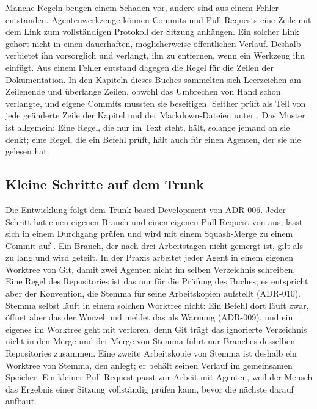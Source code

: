 Manche Regeln beugen einem Schaden vor, andere sind aus einem Fehler entstanden.
Agentenwerkzeuge können Commits und Pull Requests eine Zeile
mit dem Link zum vollständigen Protokoll der Sitzung anhängen.
Ein solcher Link gehört nicht in einen dauerhaften, möglicherweise öffentlichen Verlauf.
Deshalb verbietet  ihn vorsorglich
und verlangt, ihn zu entfernen, wenn ein Werkzeug ihn einfügt.
Aus einem Fehler entstand dagegen die Regel für die Zeilen der Dokumentation.
In den Kapiteln dieses Buches sammelten sich Leerzeichen am Zeilenende und überlange Zeilen,
obwohl  das Umbrechen von Hand schon verlangte,
und eigene Commits mussten sie beseitigen.
Seither prüft  als Teil von 
jede geänderte Zeile der Kapitel und der Markdown-Dateien unter .
Das Muster ist allgemein:
Eine Regel, die nur im Text steht, hält, solange jemand an sie denkt;
eine Regel, die ein Befehl prüft, hält auch für einen Agenten, der sie nie gelesen hat.

\subsection{Kleine Schritte auf dem Trunk}

Die Entwicklung folgt dem Trunk-based Development von ADR-006.
Jeder Schritt hat einen eigenen Branch und einen eigenen Pull Request von  aus,
lässt sich in einem Durchgang prüfen
und wird mit einem Squash-Merge zu einem Commit auf .
Ein Branch, der nach drei Arbeitstagen nicht gemergt ist, gilt als zu lang und wird geteilt.
In der Praxis arbeitet jeder Agent in einem eigenen Worktree von Git,
damit zwei Agenten nicht im selben Verzeichnis schreiben.
Eine Regel des Repositories ist das nur für die Prüfung des Buches;
es entspricht aber der Konvention, die Stemma für seine Arbeitskopien aufstellt (ADR-010).
Stemma selbst läuft in einem solchen Worktree nicht:
Ein Befehl dort läuft zwar, öffnet aber das  der Wurzel
und meldet das als Warnung (ADR-009),
und ein eigenes  im Worktree geht mit  verloren,
denn Git trägt das ignorierte Verzeichnis nicht in den Merge
und der Merge von Stemma führt nur Branches desselben Repositories zusammen.
Eine zweite Arbeitskopie von Stemma ist deshalb ein Worktree von Stemma, den
 anlegt; er behält seinen Verlauf im gemeinsamen Speicher.
Ein kleiner Pull Request passt zur Arbeit mit Agenten,
weil der Mensch das Ergebnis einer Sitzung vollständig prüfen kann,
bevor die nächste darauf aufbaut.

